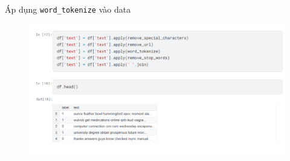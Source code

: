 \documentclass[serif, aspectratio=169]{beamer}
\begin{document}
	\begin{frame}{Áp dụng \texttt{word\_tokenize} vào data}
		\begin{figure}
			\centering
			\includegraphics[width=1\linewidth]{pic/apply-tokenize.png}
			\label{fig:apply-tokenize}
		\end{figure}
	\end{frame}
	
\end{document}
